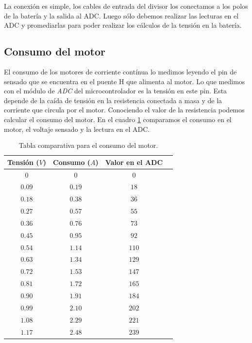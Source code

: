 La conexi\'on es simple, los cables de entrada del divisor los conectamos a los polos de la bater\'ia y la salida al ADC.
Luego s\'olo debemos realizar las lecturas en el ADC y promediarlas para poder realizar los c\'alculos de la tensi\'on en la bater\'ia.

\subsection{Consumo del motor}
\label{h_sensado_consumo}

El consumo de los motores de corriente cont\'inua lo medimos leyendo el pin de sensado que se encuentra en el puente H que alimenta al motor.
Lo que medimos con el m\'odulo de \emph{ADC} del microcontrolador es la tensi\'on en este pin.
Esta depende de la ca\'ida de tensi\'on en la resistencia conectada a masa y de la corriente que circula por el motor.
Conociendo el valor de la resistencia podemos calcular el consumo del motor.
En el cuadro \ref{hT_consumo} comparamos el consumo en el motor, el voltaje sensado y la lectura en el ADC.

\begin{table}[ht]
	\begin{center}
		\begin{tabular}{|c|c|c|c|}
			\hline
			Tensi\'on ($V$) & Consumo ($A$) & Valor en el ADC \\
			\hline
			$0$ & $0$ & $0$ \\
			$0.09$ & $0.19$ & $18$ \\
			$0.18$ & $0.38$ & $36$ \\
			$0.27$ & $0.57$ & $55$ \\
			$0.36$ & $0.76$ & $73$ \\
			$0.45$ & $0.95$ & $92$ \\
			$0.54$ & $1.14$ & $110$ \\
			$0.63$ & $1.34$ & $129$ \\
			$0.72$ & $1.53$ & $147$ \\
			$0.81$ & $1.72$ & $165$ \\
			$0.90$ & $1.91$ & $184$ \\
			$0.99$ & $2.10$ & $202$ \\
			$1.08$ & $2.29$ & $221$ \\
			$1.17$ & $2.48$ & $239$ \\
			\hline
		\end{tabular}
	\end{center}
	\caption{Tabla comparativa para el consumo del motor.}
	\label{hT_consumo}
\end{table}

